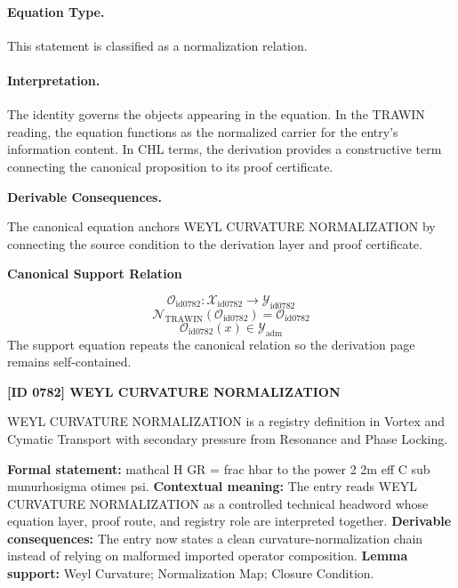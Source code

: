 \paragraph{Equation Type.}
This statement is classified as a normalization relation.

\paragraph{Interpretation.}
The identity governs the objects appearing in the equation. In the TRAWIN reading, the equation functions as the normalized carrier for the entry’s information content. In CHL terms, the derivation provides a constructive term connecting the canonical proposition to its proof certificate.

\par\vspace{0.35em}
\noindent\textbf{Derivable Consequences.}\quad
\begingroup
\footnotesize
\raggedright
The canonical equation anchors WEYL CURVATURE NORMALIZATION by connecting the source condition to the derivation layer and proof certificate.
\par\endgroup

\noindent\textbf{Canonical Support Relation}\par
\[
\mathcal{O}_{\mathrm{id0782}}:\mathcal{X}_{\mathrm{id0782}}\longrightarrow\mathcal{Y}_{\mathrm{id0782}}
\]
\[
\mathcal{N}_{\mathrm{TRAWIN}}(\mathcal{O}_{\mathrm{id0782}})=\mathcal{O}_{\mathrm{id0782}}
\]
\[
\mathcal{O}_{\mathrm{id0782}}(x)\in\mathcal{Y}_{\mathrm{adm}}
\]
\noindent The support equation repeats the canonical relation so the derivation page remains self-contained.\par

\clearpage
\noindent\textbf{[ID 0782] WEYL CURVATURE NORMALIZATION}\par
\vspace{0.35em}
\begingroup\small
{}
WEYL CURVATURE NORMALIZATION is a registry definition in Vortex and Cymatic Transport with secondary pressure from Resonance and Phase Locking.

\begingroup\footnotesize\setlength{\emergencystretch}{3em}\sloppy
\textbf{Formal statement:} mathcal H GR = frac hbar to the power 2 2m eff C sub munurhosigma otimes psi. \textbf{Contextual meaning:} The entry reads WEYL CURVATURE NORMALIZATION as a controlled technical headword whose equation layer, proof route, and registry role are interpreted together. \textbf{Derivable consequences:} The entry now states a clean curvature-normalization chain instead of relying on malformed imported operator composition. \textbf{Lemma support:} Weyl Curvature; Normalization Map; Closure Condition.\par
\endgroup


